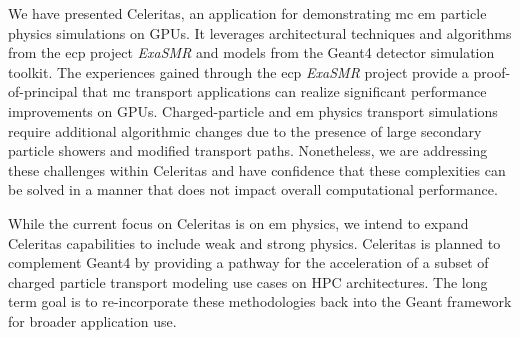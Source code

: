 \documentclass[10pt]{article}
\begin{document}
We have presented Celeritas, an application for demonstrating \ac{mc} \ac{em}
particle physics simulations on GPUs. It leverages architectural
techniques and algorithms from the \ac{ecp} project \emph{ExaSMR} and models
from the Geant4 detector simulation toolkit. The experiences gained through the
\ac{ecp} \emph{ExaSMR} project provide a proof-of-principal that \ac{mc}
transport applications can realize significant performance improvements on GPUs.
Charged-particle and \ac{em} physics transport simulations require additional
algorithmic changes due to the presence of large secondary particle showers and
modified transport paths.  Nonetheless, we are addressing these challenges
within Celeritas and have confidence that these complexities can be solved in a
manner that does not impact overall computational performance.

While the current focus on Celeritas is on \ac{em} physics, we intend to expand
Celeritas capabilities to include weak and strong physics. Celeritas is planned
to complement Geant4 by providing a pathway for the acceleration of a subset of
charged particle transport modeling use cases on HPC architectures. The long
term goal is to re-incorporate these methodologies back into the Geant framework
for broader application use.





\pagebreak
\printbibliography

\end{document}
